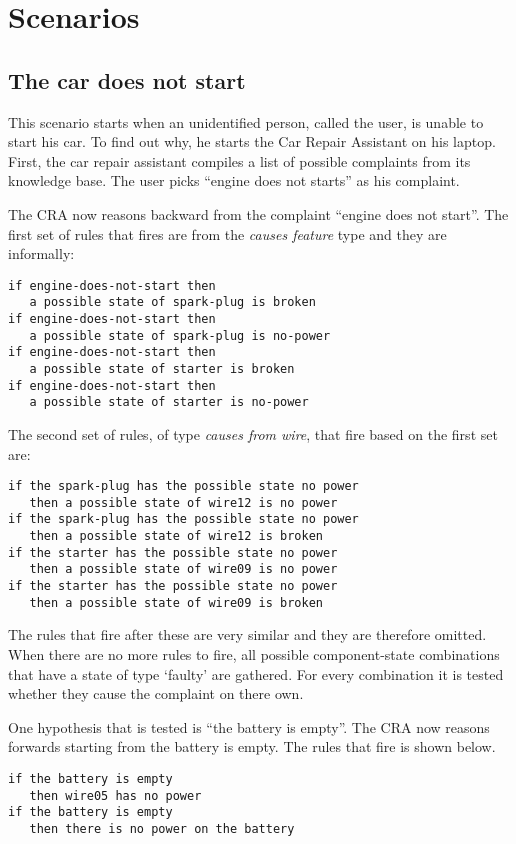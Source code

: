 \section{Scenarios}
\label{sec:scenarios}

\subsection{The car does not start}
\label{sec:scenario_engine}
This scenario starts when an unidentified person, called the user, is unable to start his car. To find out why, he starts the Car Repair Assistant on his laptop. First, the car repair assistant compiles a list of possible complaints from its knowledge base. The user picks ``engine does not starts'' as his complaint.

The CRA now reasons backward from the complaint ``engine does not start''. The first set of rules that fires are from the \emph{causes feature} type and they are informally:
\begin{verbatim}
if engine-does-not-start then 
   a possible state of spark-plug is broken
if engine-does-not-start then 
   a possible state of spark-plug is no-power
if engine-does-not-start then 
   a possible state of starter is broken
if engine-does-not-start then 
   a possible state of starter is no-power
\end{verbatim}

The second set of rules, of type \emph{causes from wire}, that fire based on the first set are:
\begin{verbatim}
if the spark-plug has the possible state no power 
   then a possible state of wire12 is no power
if the spark-plug has the possible state no power 
   then a possible state of wire12 is broken
if the starter has the possible state no power 
   then a possible state of wire09 is no power
if the starter has the possible state no power 
   then a possible state of wire09 is broken
\end{verbatim}

The rules that fire after these are very similar and they are therefore omitted. When there are no more rules to fire, all possible component-state combinations that have a state of type `faulty' are gathered. For every combination it is tested whether they cause the complaint on there own. 

One hypothesis that is tested is ``the battery is empty''. The CRA now reasons forwards starting from the battery is empty. The rules that fire is shown below.
\begin{verbatim}
if the battery is empty 
   then wire05 has no power
if the battery is empty 
   then there is no power on the battery
\end{verbatim}

